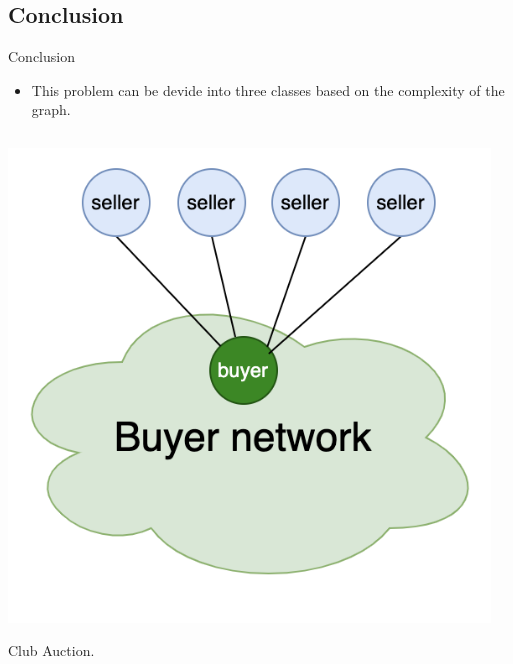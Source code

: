\documentclass{beamer}
\begin{document}
\subsection{Conclusion}
\begin{frame}{Conclusion}
	\begin{itemize}
		\item This problem can be devide into three classes based on the complexity of the graph.
	\end{itemize}
	\begin{columns}
		\begin{column}{0.3\textwidth}
			\begin{center}
				\includegraphics[width=\textwidth]{NetworkStructure1}
			\end{center}
			Club Auction.
		\end{column}
		\begin{column}{0.3\textwidth}
			\begin{center}

\end{center}
\end{column}
\end{columns}
\end{frame}
\end{document}
